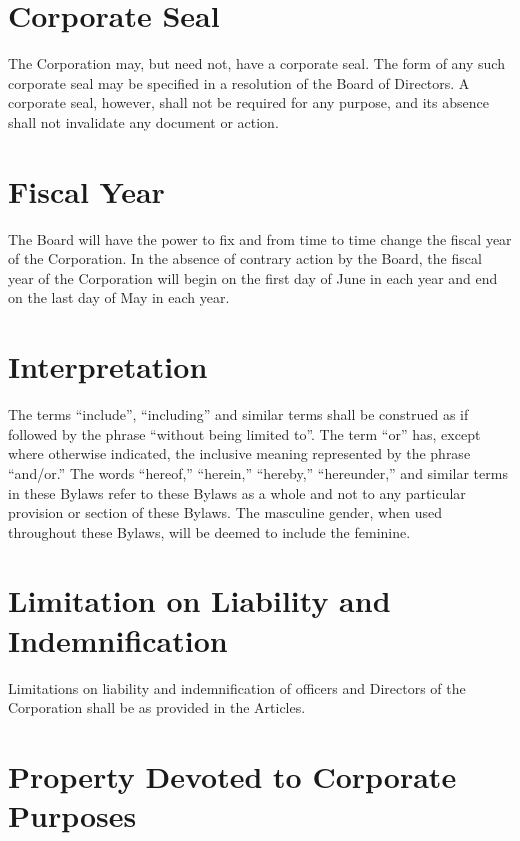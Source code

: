 \documentclass[
]{book}
\begin{document}
\section{Corporate Seal}\label{corporate-seal}

The Corporation may, but need not, have a corporate seal. The form of any such corporate seal may be specified in a resolution of the Board of Directors. A corporate seal, however, shall not be required for any purpose, and its absence shall not invalidate any document or action.

\section{Fiscal Year}\label{fiscal-year}

The Board will have the power to fix and from time to time change the fiscal year of the Corporation. In the absence of contrary action by the Board, the fiscal year of the Corporation will begin on the first day of June in each year and end on the last day of May in each year.

\section{Interpretation}\label{interpretation}

The terms ``include'', ``including'' and similar terms shall be construed as if followed by the phrase ``without being limited to''. The term ``or'' has, except where otherwise indicated, the inclusive meaning represented by the phrase ``and/or.'' The words ``hereof,'' ``herein,'' ``hereby,'' ``hereunder,'' and similar terms in these Bylaws refer to these Bylaws as a whole and not to any particular provision or section of these Bylaws. The masculine gender, when used throughout these Bylaws, will be deemed to include the feminine.

\section{Limitation on Liability and Indemnification}\label{limitation-on-liability-and-indemnification}

Limitations on liability and indemnification of officers and Directors of the Corporation shall be as provided in the Articles.

\section{Property Devoted to Corporate Purposes}\label{property-devoted-to-corporate-purposes}
\end{document}
